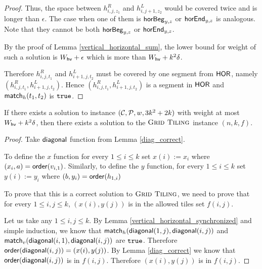 \begin{proof}
Thus, the space between $h^R_{i,j,z_1}$ and $h^L_{i,j+1,z_2}$
would be covered twice and is longer than $\epsilon$.
The case when one of them is $\mathsf{horBeg}_{y,z}$ or $\mathsf{horEnd}_{y,z}$ is analogous.
Note that they cannot be both $\mathsf{horBeg}_{y,z}$ or $\mathsf{horEnd}_{y,z}$.

By the proof of Lemma \ref{vertical_horizontal_sum},
the lower bound for weight of such a solution is $W_{\mathsf{hv}} + \epsilon$
which is more than $W_{\mathsf{hv}}+k^2\delta$.

Therefore $h^R_{i,j,t_1}$ and $h^L_{i+1,j,t_2}$ must be covered
by one segment from $\mathsf{HOR}$, namely $(h^R_{i,j,t_1}, h^L_{i+1,j,t_2})$.
Hence $(h^R_{i,j,t_1}, h^L_{i+1,j,t_2})$ is a segment in $\mathsf{HOR}$
and $\mathsf{match}_h(t_1,t_2)$ is $\texttt{true}$.
\end{proof}


\begin{lemma}
\label{grid_tiling_exists}
	If there exists a solution to instance $(\mathcal{C}, \mathcal{P}, w, 3k^2+2k)$
	with weight at most $W_{\mathsf{hv}}+k^2\delta$,
	then there exists a solution to the $\textsc{Grid Tiling}$ instance $(n,k,f)$.
\end{lemma}

\begin{proof}
Take $\mathsf{diagonal}$ function from Lemma \ref{diag_correct}.

To define the $x$ function 
for every $1 \le i \le k$ set $x(i) := x_i$
where $(x_i, a) = \mathsf{order}(v_{i,1})$.
Similarly, to define the $y$ function,
for every $1 \le i \le k$ set $y(i) := y_i$
where $(b, y_i) = \mathsf{order}(h_{1,i})$

To prove that this is a correct solution to $\textsc{Grid Tiling}$,
we need to prove that 
for every $1 \le i,j \le k$, $(x(i), y(j))$ is in
the allowed tiles set $f(i,j)$.

Let us take any $1 \le i,j \le k$.
By Lemma \ref{vertical_horizontal_synchronized}
and simple induction,
we know that $\mathsf{match}_h(\mathsf{diagonal}(1, j),\mathsf{diagonal}(i, j))$ and
$\mathsf{match}_v(\mathsf{diagonal}(i, 1),\mathsf{diagonal}(i, j))$ are $\texttt{true}$.
Therefore $\mathsf{order}(\mathsf{diagonal}(i,j)) = (x(i), y(j))$.
By Lemma \ref{diag_correct} we know that 
$\mathsf{order}(\mathsf{diagonal}(i,j))$ is in $f(i,j)$.
Therefore 
$(x(i), y(j))$
is in $f(i,j)$.
\end{proof}

